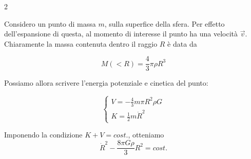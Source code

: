 \documentclass{report}
\begin{document}
\begin{multicols}{2}

Considero un punto di massa $m$, sulla superfice della sfera. Per effetto dell'espansione di questa, al momento di interesse il punto ha una velocità $\vec{v}$. Chiaramente la massa contenuta dentro il raggio $R$ è data da 

\begin{equation}
    M(<R) = \frac{4}{3}\pi \rho R^3
\end{equation}

\columnbreak



\end{multicols}

\vspace{0.5cm}
Possiamo allora scrivere l'energia potenziale e cinetica del punto: 

\[\begin{cases}
    V = - \frac{4}{3}m\pi R^2 \rho G \\
    K = \frac{1}{2}m\dot{R}^2
\end{cases}\]

Imponendo la condizione $K + V = cost.$, otteniamo \\

\begin{equation}
    \dot{R}^2 - \frac{8\pi G \rho}{3}R^2 = cost. 
\end{equation}
\end{document}
